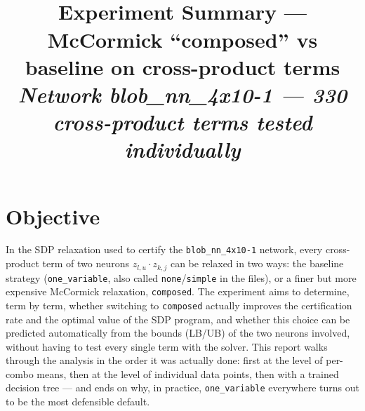 \documentclass[11pt,a4paper]{article}
\title{\vspace{-1.5cm}{\color{accentblue}\textbf{FastSDPCertification}}\\[4pt]
\textbf{\Large Experiment Summary --- McCormick ``composed'' vs baseline on cross-product terms}\\[4pt]
{\normalsize\itshape\color{black!60} Network blob\_nn\_4x10-1 --- 330 cross-product terms tested individually}}
\author{}
\date{}
\begin{document}
\maketitle
\vspace{-1.3cm}

\section{Objective}
In the SDP relaxation used to certify the \texttt{blob\_nn\_4x10-1} network, every cross-product term of two neurons $z_{l,u} \cdot z_{k,j}$ can be relaxed in two ways: the baseline strategy (\texttt{one\_variable}, also called \texttt{none}/\texttt{simple} in the files), or a finer but more expensive McCormick relaxation, \texttt{composed}. The experiment aims to determine, term by term, whether switching to \texttt{composed} actually improves the certification rate and the optimal value of the SDP program, and whether this choice can be predicted automatically from the bounds (LB/UB) of the two neurons involved, without having to test every single term with the solver. This report walks through the analysis in the order it was actually done: first at the level of per-combo means, then at the level of individual data points, then with a trained decision tree --- and ends on why, in practice, \texttt{one\_variable} everywhere turns out to be the most defensible default.
\end{document}
